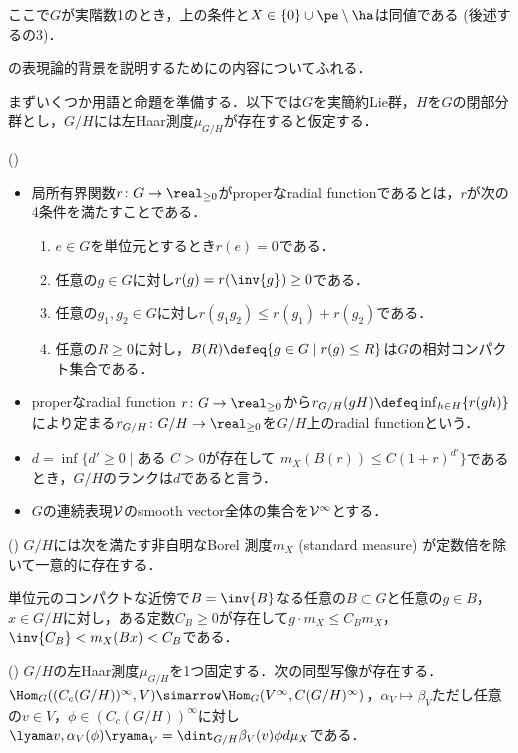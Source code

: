 ここで$G$が実階数1のとき，上の条件と$X\in \{0\}\cup\pe\setminus\ha $は同値である (後述するの3)．



の表現論的背景を説明するために\cite{ber88}の内容についてふれる．

まずいくつか用語と命題を準備する．以下では$G$を実簡約Lie群，$H$を$G$の閉部分群とし，$G/H$には左Haar測度$\mu_{G/H} $が存在すると仮定する．
\begin{defi*}(\cite{ber88})
  \leavevmode\vspace{-1em}
  \begin{itemize}
  \item 局所有界関数$r\colon G\to \real_{\geq 0} $がproperなradial functionであるとは，$r$が次の4条件を満たすことである．
    \begin{enumerate}
    \item $e\in G$を単位元とするとき$r(e) = 0 $である．
    \item 任意の$g\in G$に対し$r(g) = r(\inv{g})\geq 0  $である．
    \item 任意の$g_1,g_2\in G$に対し$r(g_1g_2)\leq r(g_1) + r(g_2)  $である．
    \item 任意の$R\geq 0$に対し，$B(R)\defeq \{g\in G\mid r(g)\leq R \} $は$G$の相対コンパクト集合である．
    \end{enumerate}
  \item properなradial function $r\colon G\to \real_{\geq 0} $から$r_{G/H}(gH)\defeq \inf_{h\in H}\{r(gh) \}$により定まる${r_{G/H}\colon G/H\to \real_{\geq 0}}$を$G/H$上のradial functionという．
  \item $d = \inf\{d'\geq 0\mid \text{ある } C > 0\text{が存在して }  m_X(B(r))\leq C(1+r)^{d'}\} $であるとき，$G/H$のランクは$d$であると言う．
  \item $G$の連続表現$\cal{V} $のsmooth vector全体の集合を$\cal{V}^{\infty} $とする．
  \end{itemize}
\end{defi*}
\begin{thmdef*}(\cite[p.~683]{ber88})
  $G/H$には次を満たす非自明なBorel 測度$m_X $ (standard measure) が定数倍を除いて一意的に存在する．

  単位元のコンパクトな近傍で$B = \inv{B} $なる任意の$B\subset G$と任意の$g\in B$，$x\in G/H$に対し，ある定数$C_B\geq 0 $が存在して$g\cdot m_X \leq C_B m_X$，$ \inv{C_B} < m_X(Bx) < C_{B}$である．
\end{thmdef*}
\begin{thmdef*}(\cite[p.~678]{ber88})
  $G/H$の左Haar測度$\mu_{G/H} $を1つ固定する．次の同型写像が存在する．$\Hom_{G}((C_c(G/H))^{\infty}, V )\simarrow \Hom_{G}(V^{\infty}, C(G/H)^{\infty}) $，$\alpha_V\mapsto \beta_V$ただし任意の$v\in V$，$\phi \in  (C_c(G/H))^{\infty} $に対し$ \lyama v,\alpha_V(\phi)\ryama_{V} = \dint_{G/H}\beta_V(v)\phi d\mu_X  $である．
\end{thmdef*}


